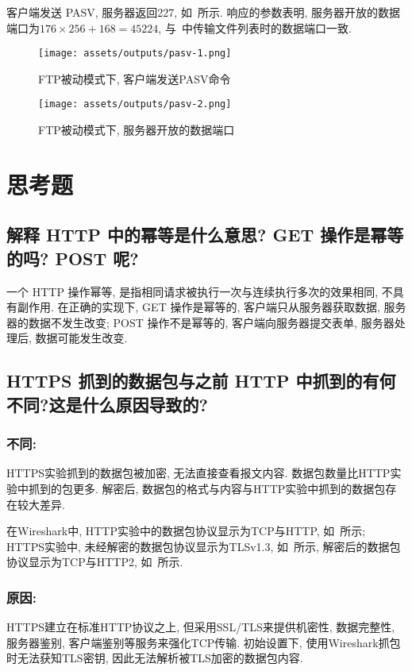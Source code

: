 \documentclass{ned-article}
\begin{document}
客户端发送 PASV, 服务器返回227, 如~所示. 响应的参数表明, 服务器开放的数据端口为$176 \times 256 + 168 = 45224$, 与~中传输文件列表时的数据端口一致.

\begin{figure}[H]
    \centering
    \texttt{[image: assets/outputs/pasv-1.png]}
    \caption{FTP被动模式下, 客户端发送PASV命令}\label{fig:pasv-1}
\end{figure}

\begin{figure}[H]
    \centering
    \texttt{[image: assets/outputs/pasv-2.png]}
    \caption{FTP被动模式下, 服务器开放的数据端口}\label{fig:pasv-2}
\end{figure}

\section{思考题}

\subsection[第1题]{解释 HTTP 中的幂等是什么意思? GET 操作是幂等的吗? POST 呢?}

一个 HTTP 操作幂等, 是指相同请求被执行一次与连续执行多次的效果相同, 不具有副作用. 在正确的实现下, GET 操作是幂等的, 客户端只从服务器获取数据, 服务器的数据不发生改变;  POST 操作不是幂等的, 客户端向服务器提交表单, 服务器处理后, 数据可能发生改变.

\subsection[第2题]{HTTPS 抓到的数据包与之前 HTTP 中抓到的有何不同?这是什么原因导致的?}

\subsubsection*{不同:}
HTTPS实验抓到的数据包被加密, 无法直接查看报文内容. 数据包数量比HTTP实验中抓到的包更多. 解密后, 数据包的格式与内容与HTTP实验中抓到的数据包存在较大差异.

在Wireshark中, HTTP实验中的数据包协议显示为TCP与HTTP, 如~所示; HTTPS实验中, 未经解密的数据包协议显示为TLSv1.3, 如~所示, 解密后的数据包协议显示为TCP与HTTP2, 如~所示.

\subsubsection*{原因:}
HTTPS建立在标准HTTP协议之上, 但采用SSL/TLS来提供机密性, 数据完整性, 服务器鉴别, 客户端鉴别等服务来强化TCP传输. 初始设置下, 使用Wireshark抓包时无法获知TLS密钥, 因此无法解析被TLS加密的数据包内容. 
\end{document}
